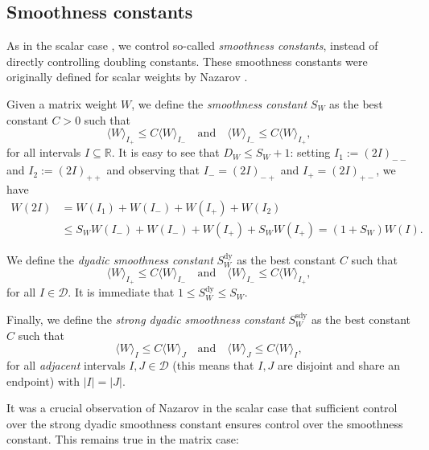\documentclass{amsart}
\newcommand{\R}{\mathbb{R}}
\newcommand{\cD}{\mathcal{D}}
\theoremstyle{definition}
\theoremstyle{remark}
\begin{document}
	\subsection{Smoothness constants}
	
	As in the scalar case \cite{KaTr, Na}, we control so-called \emph{smoothness constants}, instead of directly controlling doubling constants. These smoothness constants were originally defined for scalar weights by Nazarov \cite{Na}.
	
	Given a matrix weight $W$, we define the \emph{smoothness constant} $S_{W}$ as the best constant $C>0$ such that 
	\begin{equation*}
		\langle W\rangle_{I_{+}}\leq C\langle W\rangle_{I_{-}}\quad\text{and}\quad\langle W\rangle_{I_{-}}\leq C\langle W\rangle_{I_{+}},
	\end{equation*}
	for all intervals $I\subseteq\R$. It is easy to see that $D_{W}\leq S_{W}+1$: setting $I_1:=(2I)_{--}$ and $I_2:=(2I)_{++}$ and observing that $I_{-}=(2I)_{-+}$ and $I_{+}=(2I)_{+-}$, we have
	\begin{align*}
		W(2I)&=W(I_1)+W(I_{-})+W(I_{+})+W(I_2)\\
		&\leq S_{W}W(I_{-})+W(I_{-})+W(I_{+})+S_{W}W(I_{+})=(1+S_{W}) W(I).
	\end{align*}

	We define the \emph{dyadic smoothness constant} $S_{W}^{\text{dy}}$ as the best constant $C$ such that
	\begin{equation*}
		\langle W\rangle_{I_{+}}\leq C\langle W\rangle_{I_{-}}\quad\text{and}\quad\langle W\rangle_{I_{-}}\leq C\langle W\rangle_{I_{+}},
	\end{equation*}
	for all $I\in\cD$. It is immediate that $1\leq S_{W}^{\text{dy}}\leq S_{W}$.
	
	Finally, we define the \emph{strong dyadic smoothness constant} $S_{W}^{\text{sdy}}$ as the best constant $C$ such that
	\begin{equation*}
		\langle W\rangle_{I}\leq C\langle W\rangle_{J}\quad\text{and}\quad\langle W\rangle_{J}\leq C\langle W\rangle_{I},
	\end{equation*}
	for all \emph{adjacent} intervals $I,J\in\cD$ (this means that $I,J$ are disjoint and share an endpoint) with $|I|=|J|$.

    It was a crucial observation of Nazarov in the scalar case \cite{Na} that sufficient control over the strong dyadic smoothness constant ensures control over the smoothness constant. This remains true in the matrix case:
\end{document}
